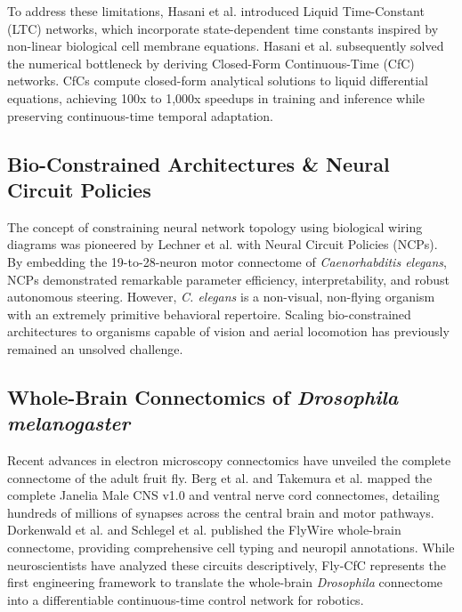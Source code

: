 \documentclass{article}
\begin{document}
To address these limitations, Hasani et al. \cite{hasani2021liquid} introduced Liquid Time-Constant (LTC) networks, which incorporate state-dependent time constants inspired by non-linear biological cell membrane equations. Hasani et al. \cite{hasani2022closed} subsequently solved the numerical bottleneck by deriving Closed-Form Continuous-Time (CfC) networks. CfCs compute closed-form analytical solutions to liquid differential equations, achieving 100x to 1,000x speedups in training and inference while preserving continuous-time temporal adaptation.

\subsection{Bio-Constrained Architectures \& Neural Circuit Policies}
The concept of constraining neural network topology using biological wiring diagrams was pioneered by Lechner et al. \cite{lechner2020neural} with Neural Circuit Policies (NCPs). By embedding the 19-to-28-neuron motor connectome of \emph{Caenorhabditis elegans}, NCPs demonstrated remarkable parameter efficiency, interpretability, and robust autonomous steering. However, \emph{C. elegans} is a non-visual, non-flying organism with an extremely primitive behavioral repertoire. Scaling bio-constrained architectures to organisms capable of vision and aerial locomotion has previously remained an unsolved challenge.

\subsection{Whole-Brain Connectomics of \emph{Drosophila melanogaster}}
Recent advances in electron microscopy connectomics have unveiled the complete connectome of the adult fruit fly. Berg et al. \cite{berg2026sexual} and Takemura et al. \cite{takemura2023connectome} mapped the complete Janelia Male CNS v1.0 and ventral nerve cord connectomes, detailing hundreds of millions of synapses across the central brain and motor pathways. Dorkenwald et al. \cite{dorkenwald2024neuronal} and Schlegel et al. \cite{schlegel2024whole} published the FlyWire whole-brain connectome, providing comprehensive cell typing and neuropil annotations. While neuroscientists have analyzed these circuits descriptively, Fly-CfC represents the first engineering framework to translate the whole-brain \emph{Drosophila} connectome into a differentiable continuous-time control network for robotics.
\end{document}

